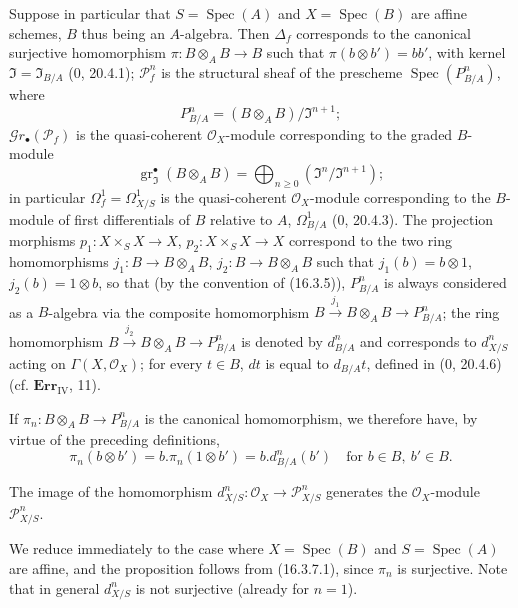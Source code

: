 \begin{env}[16.3.7]
\label{IV.16.3.7}
Suppose in particular that $S=\operatorname{Spec}(A)$ and
$X=\operatorname{Spec}(B)$ are affine schemes, $B$ thus being an
$A$-algebra. Then $\Delta_f$ corresponds to the canonical surjective homomorphism
$\pi:B\otimes_A B\to B$ such that $\pi(b\otimes b')=bb'$, with kernel
$\mathfrak{I}=\mathfrak{I}_{B/A}$ (0, 20.4.1); $\mathscr{P}_f^n$ is the
structural sheaf of the prescheme $\operatorname{Spec}(P_{B/A}^n)$, where
\[
  P_{B/A}^n=(B\otimes_A B)/\mathfrak{I}^{n+1};
\]
$\mathscr{G}r_\bullet(\mathscr{P}_f)$ is the quasi-coherent
$\mathcal{O}_X$-module corresponding to the graded $B$-module
\[
  \operatorname{gr}_{\mathfrak{I}}^\bullet(B\otimes_A B)
  =\bigoplus_{n\geq 0}(\mathfrak{I}^n/\mathfrak{I}^{n+1});
\]
in particular $\Omega_f^1=\Omega_{X/S}^1$ is the quasi-coherent
$\mathcal{O}_X$-module corresponding to the $B$-module of first differentials of $B$
relative to $A$, $\Omega_{B/A}^1$ (0, 20.4.3). The projection morphisms
$p_1:X\times_S X\to X$, $p_2:X\times_S X\to X$ correspond to the two
ring homomorphisms $j_1:B\to B\otimes_A B$, $j_2:B\to B\otimes_A B$
such that $j_1(b)=b\otimes 1$, $j_2(b)=1\otimes b$, so that (by the
convention of (16.3.5)), $P_{B/A}^n$ is always considered as a
$B$-algebra via the composite homomorphism
$B\xrightarrow{j_1}B\otimes_A B\to P_{B/A}^n$; the ring homomorphism
$B\xrightarrow{j_2}B\otimes_A B\to P_{B/A}^n$ is denoted by $d_{B/A}^n$ and corresponds
to $d_{X/S}^n$ acting on $\Gamma(X,\mathcal{O}_X)$; for every $t\in B$, $dt$
is equal to $d_{B/A}t$, defined in (0, 20.4.6) (cf. $\mathbf{Err}_{\mathrm{IV}}$,
11).

If $\pi_n:B\otimes_A B\to P_{B/A}^n$ is the canonical homomorphism, we therefore have,
by virtue of the preceding definitions,
\[
  \pi_n(b\otimes b')=b.\pi_n(1\otimes b')=b.d_{B/A}^n(b')
  \quad\text{for }b\in B,\ b'\in B.
  \tag{16.3.7.1}
  \label{IV.16.3.7.1}
\]
\end{env}

\begin{proposition}[16.3.8]
\label{IV.16.3.8}
The image of the homomorphism $d_{X/S}^n:\mathcal{O}_X\to\mathscr{P}_{X/S}^n$
generates the $\mathcal{O}_X$-module $\mathscr{P}_{X/S}^n$.
\end{proposition}

We reduce immediately to the case where $X=\operatorname{Spec}(B)$ and
$S=\operatorname{Spec}(A)$ are affine, and the proposition follows from (16.3.7.1),
since $\pi_n$ is surjective. Note that in general $d_{X/S}^n$ is not
surjective (already for $n=1$).

